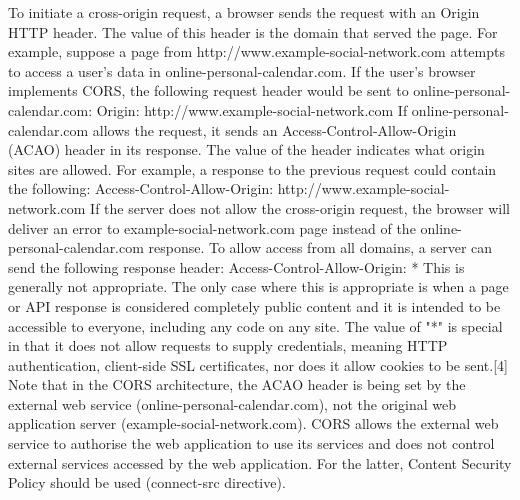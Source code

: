 To initiate a cross-origin request, a browser sends the request with an Origin HTTP header. The value of this header is the domain that served the page. For example, suppose a page from http://www.example-social-network.com attempts to access a user's data in online-personal-calendar.com. If the user's browser implements CORS, the following request header would be sent to online-personal-calendar.com:
 Origin: http://www.example-social-network.com
If online-personal-calendar.com allows the request, it sends an Access-Control-Allow-Origin (ACAO) header in its response. The value of the header indicates what origin sites are allowed. For example, a response to the previous request could contain the following:
 Access-Control-Allow-Origin: http://www.example-social-network.com
If the server does not allow the cross-origin request, the browser will deliver an error to example-social-network.com page instead of the online-personal-calendar.com response.
To allow access from all domains, a server can send the following response header:
 Access-Control-Allow-Origin: *
This is generally not appropriate. The only case where this is appropriate is when a page or API response is considered completely public content and it is intended to be accessible to everyone, including any code on any site.
The value of "*" is special in that it does not allow requests to supply credentials, meaning HTTP authentication, client-side SSL certificates, nor does it allow cookies to be sent.[4]
Note that in the CORS architecture, the ACAO header is being set by the external web service (online-personal-calendar.com), not the original web application server (example-social-network.com). CORS allows the external web service to authorise the web application to use its services and does not control external services accessed by the web application. For the latter, Content Security Policy should be used (connect-src directive).



